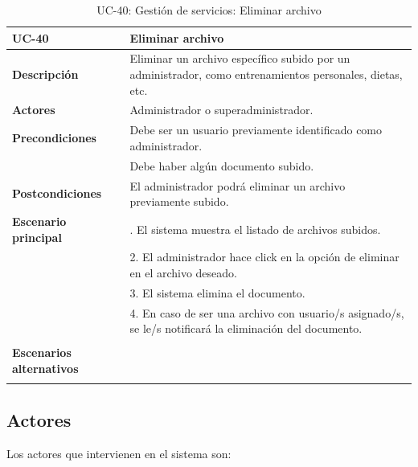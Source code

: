 \begin{table}[H]
  \begin{center}
    \begin{tabularx}{16.4cm}{|l|X|}
      \hline
      \textbf{UC-40} & \textbf{Eliminar archivo}\\
      \hline
      \textbf{Descripción} & Eliminar un archivo específico subido por un administrador, como entrenamientos personales, dietas, etc. \\
      \hline
      \textbf{Actores} & Administrador o superadministrador.\\
      \hline
      \textbf{Precondiciones} & Debe ser un usuario previamente identificado como administrador.\\
      & Debe haber algún documento subido.\\
      \hline
      \textbf{Postcondiciones} & El administrador podrá eliminar un archivo previamente subido.\\
      \hline
      \textbf{Escenario principal} & \smallskip 1. El sistema muestra el listado de archivos subidos.\\
      & 2. El administrador hace click en la opción de eliminar en el archivo deseado.\\
      & 3. El sistema elimina el documento.\\
      & 4. En caso de ser una archivo con usuario/s asignado/s, se le/s notificará la eliminación del documento.\\
      & \\
      \hline
      \textbf{Escenarios alternativos} & \\
      & \\
      \hline
    \end{tabularx}
    \caption{UC-40: Gestión de servicios: Eliminar archivo}
    \label{tab:CU-eliminar-archivo}
  \end{center}
\end{table}



\subsection{Actores} 

Los actores que intervienen en el sistema son: 

